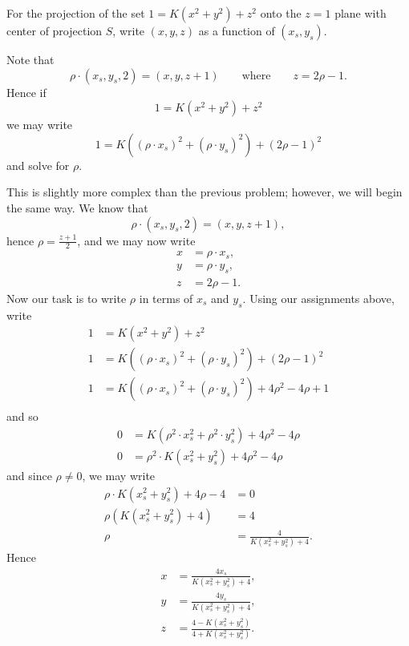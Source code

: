 \documentclass[hints,handout,12pt,noauthor,nooutcomes]{ximera}
\begin{document}
\begin{problem}
  For the projection of the set $1=K\left(x^{2}+y^{2}\right)+z^{2}$
  onto the $z=1$ plane with center of projection $S$, write
  $(x,y,z)$ as a function of $(x_s,y_s)$.
  \begin{hint}
    Note that
      \[
      \rho\cdot(x_{s},y_{s},2)=(x,y,z+1) \qquad\text{where}\qquad z = 2\rho-1.
      \]
    Hence if
    \[
    1 = K\left(x^2 + y^2\right) + z^2
    \]
    we may write
    \[
    1 = K\left((\rho\cdot x_s)^2 + (\rho\cdot y_s)^2\right) + (2\rho-1)^2
    \]
    and solve for $\rho$.
  \end{hint}
  \begin{freeResponse}
    This is slightly more complex than the previous problem; however,
    we will begin the same way. We know that
    \[
    \rho\cdot(x_{s},y_{s},2)=(x,y,z+1),
    \]
    hence $\rho=\frac{z+1}{2}$, and we may now write
    \begin{align*}
      x &= \rho \cdot x_s,\\
      y &= \rho \cdot y_s,\\
      z &= 2\rho-1.
    \end{align*}
    Now our task is to write $\rho$ in terms of $x_s$ and
    $y_s$. Using our assignments above, write
    \begin{align*}
      1 &= K\left(x^2 + y^2\right) + z^2\\
      1 &= K\left((\rho\cdot x_s)^2 + (\rho\cdot y_s)^2\right) + (2\rho-1)^2\\
      1 &= K\left((\rho\cdot x_s)^2 + (\rho\cdot y_s)^2\right) + 4\rho^2-4\rho + 1\\
    \end{align*}
    and so
    \begin{align*}
      0 &= K\left(\rho^2\cdot x_s^2 + \rho^2\cdot y_s^2\right) + 4\rho^2-4\rho\\
      0 &= \rho^2\cdot K\left(x_s^2 + y_s^2\right) + 4\rho^2-4\rho
    \end{align*}
    and since $\rho \ne 0$, we may write
    \begin{align*}
      \rho\cdot K\left(x_s^2 + y_s^2\right) + 4\rho-4 &=0 \\
      \rho\left(K\left(x_s^2 + y_s^2\right) + 4\right) &=4\\
      \rho &= \frac{4}{K\left(x_s^2 + y_s^2\right) + 4}.
    \end{align*}
    Hence
    \begin{align*}
      x &= \frac{4x_s}{K\left(x_s^2 + y_s^2\right) + 4},\\
      y &= \frac{4y_s}{K\left(x_s^2 + y_s^2\right) + 4},\\
      z &= \frac{4-K\left(x_s^2 + y_s^2\right)}{4+K\left(x_s^2 + y_s^2\right)}.
    \end{align*}
  \end{freeResponse}
\end{problem}
\end{document}
